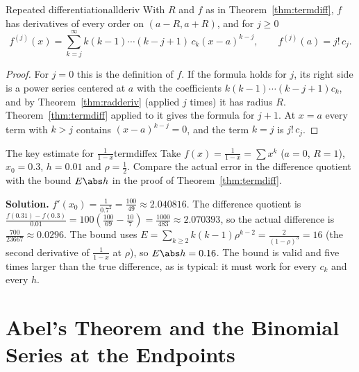 \documentclass[11pt]{article}
\begin{document}
\begin{thm}{Repeated differentiation}{allderiv}
With $R$ and $f$ as in Theorem~\ref{thm:termdiff}, $f$ has derivatives of every order on $(a-R,a+R)$, and for $j\ge0$
\[
f^{(j)}(x)=\sum_{k=j}^\infty k(k-1)\cdots(k-j+1)\,c_k(x-a)^{k-j},\qquad f^{(j)}(a)=j!\,c_j .
\]
\end{thm}
\begin{proof}
For $j=0$ this is the definition of $f$. If the formula holds for $j$, its right side is a power series centered at $a$ with the coefficients $k(k-1)\cdots(k-j+1)c_k$, and by Theorem~\ref{thm:radderiv} (applied $j$ times) it has radius $R$. Theorem~\ref{thm:termdiff} applied to it gives the formula for $j+1$. At $x=a$ every term with $k>j$ contains $(x-a)^{k-j}=0$, and the term $k=j$ is $j!\,c_j$.
\end{proof}

\begin{exmp}{The key estimate for $\frac1{1-x}$}{termdiffex}
Take $f(x)=\frac1{1-x}=\sum x^k$ ($a=0$, $R=1$), $x_0=0.3$, $h=0.01$ and $\rho=\frac12$. Compare the actual error in the difference quotient with the bound $E\abs h$ in the proof of Theorem~\ref{thm:termdiff}.

\textbf{Solution.} $f'(x_0)=\frac1{0.7^2}=\frac{100}{49}\approx2.040816$. The difference quotient is $\frac{f(0.31)-f(0.3)}{0.01}=100\left(\frac{100}{69}-\frac{10}7\right)=\frac{1000}{483}\approx2.070393$, so the actual difference is $\frac{700}{23667}\approx0.0296$. The bound uses $E=\sum_{k\ge2}k(k-1)\rho^{k-2}=\frac2{(1-\rho)^3}=16$ (the second derivative of $\frac1{1-x}$ at $\rho$), so $E\abs h=0.16$. The bound is valid and five times larger than the true difference, as is typical: it must work for every $c_k$ and every $h$.
\end{exmp}

\section{Abel's Theorem and the Binomial Series at the Endpoints}
\end{document}
